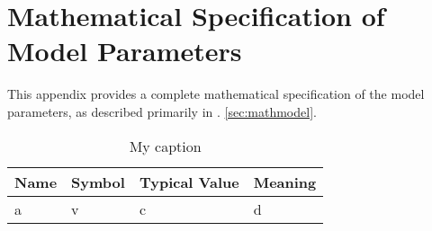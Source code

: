 \section{Mathematical Specification of Model Parameters}
\label{app:model_param}

This appendix provides a complete mathematical specification of the
model parameters, as described primarily in \label{sec:mathmodel}.
\ref{sec:mathmodel}.

\begin{table}[]
\centering
\caption{My caption}
\begin{tabular}{|l|l|l|l|}
\hline
Name & Symbol & Typical Value & Meaning \\
\hline
a     &   v     &      c         &    d     \\
\hline
\end{tabular}
\label{my-label}
\end{table}